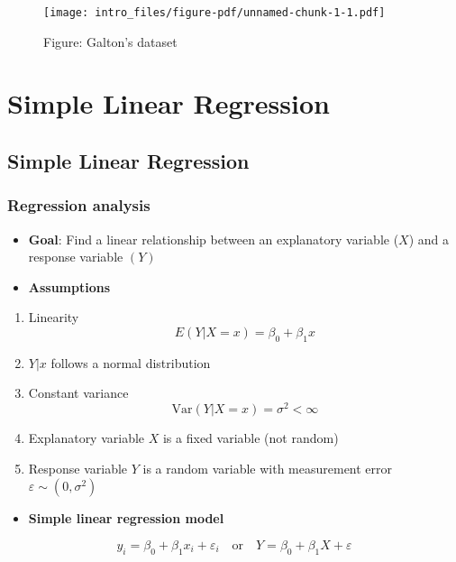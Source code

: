 \documentclass[
  letterpaper,
  DIV=11,
  numbers=noendperiod]{scrreprt}
\providecommand{\tightlist}{%
  \setlength{\itemsep}{0pt}\setlength{\parskip}{0pt}}\usepackage{longtable,booktabs,array}
\theoremstyle{definition}
\theoremstyle{plain}
\theoremstyle{definition}
\theoremstyle{definition}
\theoremstyle{remark}
\begin{document}
\begin{figure}[H]

{\centering \texttt{[image: intro\_files/figure-pdf/unnamed-chunk-1-1.pdf]}

}

\caption{Figure: Galton's dataset}

\end{figure}%

\part{Simple Linear Regression}

\chapter{Simple Linear Regression}\label{simple-linear-regression-1}

\section{Regression analysis}\label{regression-analysis}

\begin{itemize}
\item
  \textbf{Goal}: Find a linear relationship between an explanatory
  variable (\(X\)) and a response variable \((Y)\)
\item
  \textbf{Assumptions}
\end{itemize}

\begin{enumerate}
\def\labelenumi{\arabic{enumi}.}
\item
  Linearity \[
  E(Y|X=x) = \beta_0 + \beta_1 x
  \]
\item
  \(Y|x\) follows a normal distribution
\item
  Constant variance \[
  \text{Var}(Y|X=x)=\sigma^2 <\infty
  \]
\item
  Explanatory variable \(X\) is a fixed variable (not random)
\item
  Response variable \(Y\) is a random variable with measurement error
  \(\varepsilon \sim (0, \sigma^2)\)
\end{enumerate}

\begin{itemize}
\tightlist
\item
  \textbf{Simple linear regression model}
\end{itemize}

\[
y_i = \beta_0 + \beta_1 x_i + \varepsilon_i \quad{} \text{or}\quad{} Y=\beta_0 + \beta_1 X +\varepsilon
\]
\end{document}
